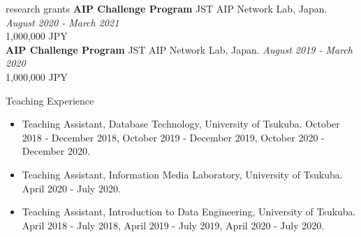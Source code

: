 \documentclass{resume} %
\begin{document}
\begin{rSection}{research grants}
{\bf AIP Challenge Program } JST AIP Network Lab, Japan. \hfill {\em August 2020 - March 2021}
\\1,000,000 JPY
\\
{\bf AIP Challenge Program } JST AIP Network Lab, Japan. \hfill {\em August 2019 - March 2020}
\\1,000,000 JPY

\end{rSection}





\begin{rSection}{Teaching Experience}
  \begin{itemize}
    \item Teaching Assistant, Database Technology, University of Tsukuba. October 2018 - December 2018, October 2019 - December 2019, October 2020 - December 2020.
    \item Teaching Assistant, Information Media Laboratory, University of Tsukuba. April 2020 - July 2020.
    \item Teaching Assistant, Introduction to Data Engineering, University of Tsukuba. April 2018 - July 2018, April 2019 - July 2019, April 2020 - July 2020.
  \end{itemize}
\end{rSection}
\end{document}
